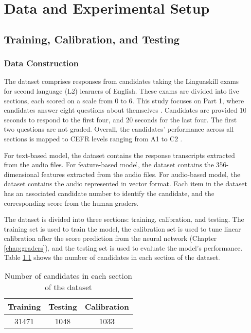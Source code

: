 \chapter{Data and Experimental Setup} \label{chap:setup}

\section{Training, Calibration, and Testing}

\subsection{Data Construction} \label{sec:data_construction}
The dataset comprises responses from candidates taking the Linguaskill exams for second language (L2)  learners of English. These exams are divided into five sections, each scored on a scale from 0 to 6. This study focuses on Part 1, where candidates answer eight questions about themselves \cite{linguaskills}. Candidates are provided 10 seconds to respond to the first four, and 20 seconds for the last four. The first two questions are not graded. Overall, the candidates' performance across all sections is mapped to CEFR levels ranging from A1 to C2 \cite{CEFR}.

For text-based model, the dataset contains the response transcripts extracted from the audio files. For feature-based model, the dataset contains the 356-dimensional features extracted from the audio files. For audio-based model, the dataset contains the audio represented in vector format. Each item in the dataset has an associated candidate number to identify the candidate, and the corresponding score from the human graders.

The dataset is divided into three sections: training, calibration, and testing. The training set is used to train the model, the calibration set is used to tune linear calibration after the score prediction from the neural network (Chapter \ref{chap:graders}), and the testing set is used to evaluate the model's performance. Table \ref{tab:data_size} shows the number of candidates in each section of the dataset.

\begin{table}[H]
    \centering
    \begin{tabular}{|c|c|c|}
        \hline
        \textbf{Training} & \textbf{Testing} & \textbf{Calibration} \\ \hline
        31471             & 1048             & 1033                 \\ \hline
    \end{tabular}
    \caption{Number of candidates in each section of the dataset}
    \label{tab:data_size}
\end{table}

